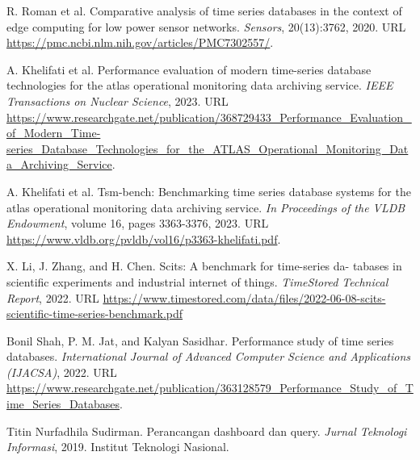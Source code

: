 \documentclass[a4paper, 12pt]{article}
\begin{document}
\begin{thebibliography}{9}

    R. Roman et al. Comparative analysis of time series databases in the context of edge computing for low power sensor networks. \textit{Sensors}, 20(13):3762, 2020. URL \url{https://pmc.ncbi.nlm.nih.gov/articles/PMC7302557/}.
    
    A. Khelifati et al. Performance evaluation of modern time-series database technologies for the atlas operational monitoring data archiving service. \textit{IEEE Transactions on Nuclear Science}, 2023. URL \url{https://www.researchgate.net/publication/368729433_Performance_Evaluation_of_Modern_Time-series_Database_Technologies_for_the_ATLAS_Operational_Monitoring_Data_Archiving_Service}.

    A. Khelifati et al. Tsm-bench: Benchmarking time series database systems for the atlas operational monitoring data archiving service. \textit{In Proceedings of the VLDB Endowment}, volume 16, pages 3363-3376, 2023. URL \url{https://www.vldb.org/pvldb/vol16/p3363-khelifati.pdf}.

    X. Li, J. Zhang, and H. Chen. Scits: A benchmark for time-series da- tabases in scientific experiments and industrial internet of things. \textit{TimeStored Technical Report}, 2022. URL \url{https://www.timestored.com/data/files/2022-06-08-scits-scientific-time-series-benchmark.pdf}

    Bonil Shah, P. M. Jat, and Kalyan Sasidhar. Performance study of time series databases. \textit{International Journal of Advanced Computer Science and Applications (IJACSA)}, 2022. URL \url{https://www.researchgate.net/publication/363128579_Performance_Study_of_Time_Series_Databases}.

    Titin Nurfadhila Sudirman. Perancangan dashboard dan query. \textit{Jurnal Teknologi Informasi}, 2019. Institut Teknologi Nasional.

\end{thebibliography}
\end{document}
